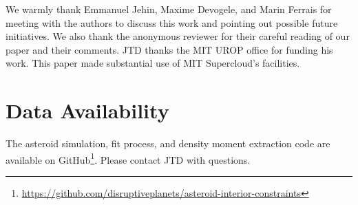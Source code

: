 \documentclass[fleqn,usenatbib]{mnras}
\begin{document}
We warmly thank Emmanuel Jehin, Maxime Devogele, and Marin Ferrais for meeting with the authors to discuss this work and pointing out possible future initiatives. We also thank the anonymous reviewer for their careful reading of our paper and their comments. JTD thanks the MIT UROP office for funding his work. This paper made substantial use of MIT Supercloud's facilities.



\section*{Data Availability}

The asteroid simulation, fit process, and density moment extraction code are available on GitHub\footnote{\url{https://github.com/disruptiveplanets/asteroid-interior-constraints}}. Please contact JTD with questions.










\bsp
\label{lastpage}
\end{document}

